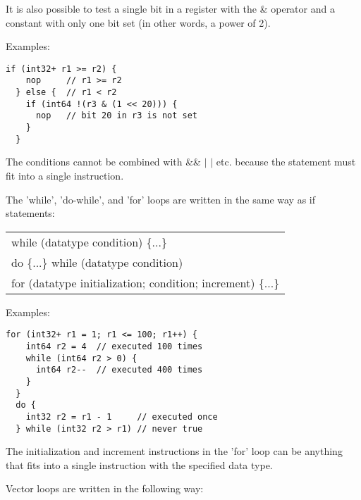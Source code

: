\documentclass[forwardcom.tex]{subfiles}
\begin{document}
It is also possible to test a single bit in a register with the \& operator and a constant with only one bit set (in other words, a power of 2).
\vspace{2mm}

Examples:
\vspace{2mm}

\begin{lstlisting}[frame=single]
  if (int32+ r1 >= r2) {
    nop     // r1 >= r2
  } else {  // r1 < r2
    if (int64 !(r3 & (1 << 20))) {
      nop   // bit 20 in r3 is not set
    }
  }  
\end{lstlisting}
\vspace{2mm}

The conditions cannot be combined with \&\& $\vert$ $\vert$ etc. because the statement must fit into a single instruction.
\vspace{2mm}

The 'while', 'do-while', and 'for' loops are written in the same way as if statements:

\begin{tabular}{|p{150mm}|}
\hline
\hspace{4mm} while (datatype condition) \{...\}\\
\hspace{4mm} do \{...\} while (datatype condition) \\
\hspace{4mm} for (datatype initialization; condition; increment) \{...\}\\
\hline
\end{tabular}
\vspace{2mm}

Examples:
\vspace{2mm}

\begin{lstlisting}[frame=single]
  for (int32+ r1 = 1; r1 <= 100; r1++) {
    int64 r2 = 4  // executed 100 times
    while (int64 r2 > 0) {
      int64 r2--  // executed 400 times
    }
  } 
  do {
    int32 r2 = r1 - 1     // executed once
  } while (int32 r2 > r1) // never true
\end{lstlisting}
\vspace{2mm}

The initialization and increment instructions in the 'for' loop can be anything that fits into a single instruction with the specified data type.
\vspace{2mm}

Vector loops are written in the following way:
\end{document}
